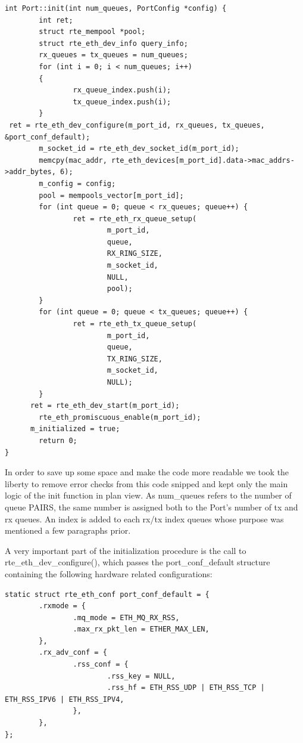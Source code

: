 \documentclass[a4paper,12p]{article}
\begin{document}
\begin{lstlisting}
int Port::init(int num_queues, PortConfig *config) {
        int ret;
        struct rte_mempool *pool;
        struct rte_eth_dev_info query_info;
        rx_queues = tx_queues = num_queues;
        for (int i = 0; i < num_queues; i++)
        {
                rx_queue_index.push(i);
                tx_queue_index.push(i);
        }
 ret = rte_eth_dev_configure(m_port_id, rx_queues, tx_queues,
&port_conf_default);
        m_socket_id = rte_eth_dev_socket_id(m_port_id);
        memcpy(mac_addr, rte_eth_devices[m_port_id].data->mac_addrs->addr_bytes, 6);
        m_config = config;
        pool = mempools_vector[m_port_id];
        for (int queue = 0; queue < rx_queues; queue++) {
                ret = rte_eth_rx_queue_setup(
                        m_port_id,
                        queue,
                        RX_RING_SIZE,
                        m_socket_id,
                        NULL,
                        pool);
        }
        for (int queue = 0; queue < tx_queues; queue++) {
                ret = rte_eth_tx_queue_setup(
                        m_port_id,
                        queue,
                        TX_RING_SIZE,
                        m_socket_id,
                        NULL);
        }
	  ret = rte_eth_dev_start(m_port_id);
        rte_eth_promiscuous_enable(m_port_id);
	  m_initialized = true;
        return 0;
}
\end{lstlisting}

In order to save up some space and make the code more readable we took the liberty to remove error checks from this code snipped and kept only the main logic of the init function in plan view. As num\_queues refers to the number of queue PAIRS, the same number is assigned both to the Port’s number of tx and rx queues. An index is added to each rx/tx index queues whose purpose was mentioned a few paragraphs prior.

A very important part of the initialization procedure is the call to rte\_eth\_dev\_configure(), which passes the port\_conf\_default structure containing the following hardware related configurations:

\begin{lstlisting}
static struct rte_eth_conf port_conf_default = {
        .rxmode = {
                .mq_mode = ETH_MQ_RX_RSS,
                .max_rx_pkt_len = ETHER_MAX_LEN,
        },
        .rx_adv_conf = {
                .rss_conf = {
                        .rss_key = NULL,
                        .rss_hf = ETH_RSS_UDP | ETH_RSS_TCP | ETH_RSS_IPV6 | ETH_RSS_IPV4,
                },
        },
};
\end{lstlisting}
\end{document}
